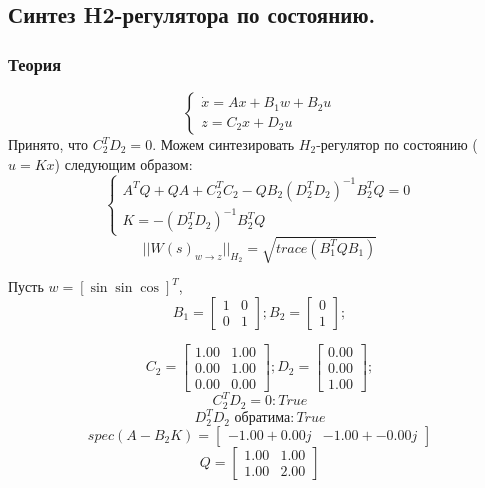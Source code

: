 \subsection{Синтез H2-регулятора по состоянию.}
\subsubsection{Теория}
\[
        \begin{cases}
                \dot{x} = A x + B_1 w + B_2 u \\
                z = C_2x + D_2 u  
        \end{cases}
\]
Принято, что \(C_2^T D_2 = 0\).
Можем синтезировать $H_2$-регулятор по состоянию ($u=Kx$) следующим образом:
\[
    \begin{cases}
        A^TQ + QA + C_2^TC_2 - QB_2(D_2^TD_2)^{-1}B_2^TQ=0 \\
        K = -(D_2^TD_2)^{-1}B_2^TQ
    \end{cases}
\]
\[||W(s)_{w \rightarrow z}||_{H_2} = \sqrt{trace(B_1^T Q B_1)}\]

Пусть \(w = [\sin \sin \cos]^T\), 
\[B_1 = \begin{bmatrix}
    1 & 0 \\ 
    0 & 1
  \end{bmatrix};
  B_2 = \begin{bmatrix}
    0 \\ 
    1
  \end{bmatrix};\]

\[C_2 = \begin{bmatrix}
    1.00 &  1.00\\
    0.00 &  1.00\\
    0.00 &  0.00
  \end{bmatrix}; D_2 = \begin{bmatrix}
    0.00\\
    0.00\\
    1.00
  \end{bmatrix};\]
  \[C_2^T D_2 = 0: True\]
  \[D_2^T D_2 \text{ обратима}: True\]
  \[spec(A-B_2 K) = \begin{bmatrix}
   -1.00 + 0.00j & -1.00 + -0.00j
  \end{bmatrix}\]
  \[Q = \begin{bmatrix}
    1.00 &  1.00\\
    1.00 &  2.00
  \end{bmatrix}\]
  

\FloatBarrier